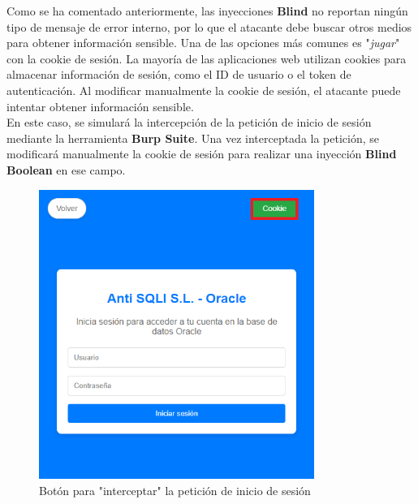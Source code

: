 \documentclass[a4paper,12pt]{article}
\begin{document}
Como se ha comentado anteriormente, las inyecciones \textbf{Blind} no reportan ningún tipo de mensaje de error interno, por lo que el atacante debe buscar otros medios para obtener información sensible. Una de las opciones más comunes es "\textit{jugar}" con la cookie de sesión. La mayoría de las aplicaciones web utilizan cookies para almacenar información de sesión, como el ID de usuario o el token de autenticación. Al modificar manualmente la cookie de sesión, el atacante puede intentar obtener información sensible. \\

En este caso, se simulará la intercepción de la petición de inicio de sesión mediante la herramienta \textbf{Burp Suite}. Una vez interceptada la petición, se modificará manualmente la cookie de sesión para realizar una inyección \textbf{Blind Boolean} en ese campo.

\begin{figure}[H]
    \centering
    \includegraphics[width=0.8\textwidth]{Imagenes/blind2.png}
    \caption{Botón para "interceptar" la petición de inicio de sesión}
\end{figure}
\end{document}
